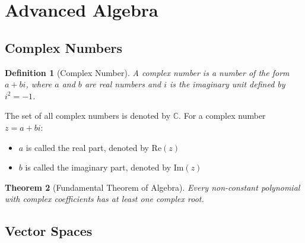 \documentclass[12pt]{article}
\newif\ifDarkMode
\newcommand{\eqcolor}[1]{\ifDarkMode\textcolor{draculaPurple}{#1}\else#1\fi}
\newcommand{\varcolor}[1]{\ifDarkMode\textcolor{draculaGreen}{#1}\else#1\fi}
\newtheorem{theorem}{Theorem}[section]
\newtheorem{definition}[theorem]{Definition}
\begin{document}
\section{\textcolor{draculaCyan}{Advanced Algebra}}

\subsection{\textcolor{draculaYellow}{Complex Numbers}}

\begin{definition}[Complex Number]
A complex number is a number of the form $\eqcolor{a + bi}$, where $\varcolor{a}$ and $\varcolor{b}$ are real numbers and $\varcolor{i}$ is the imaginary unit defined by $\eqcolor{i^2 = -1}$.
\end{definition}

The set of all complex numbers is denoted by $\varcolor{\mathbb{C}}$. For a complex number $\varcolor{z = a + bi}$:
\begin{itemize}
    \item $\varcolor{a}$ is called the real part, denoted by $\eqcolor{\text{Re}(z)}$
    \item $\varcolor{b}$ is called the imaginary part, denoted by $\eqcolor{\text{Im}(z)}$
\end{itemize}

\begin{theorem}[Fundamental Theorem of Algebra]
Every non-constant polynomial with complex coefficients has at least one complex root.
\end{theorem}

\subsection{\textcolor{draculaYellow}{Vector Spaces}}
\end{document}

